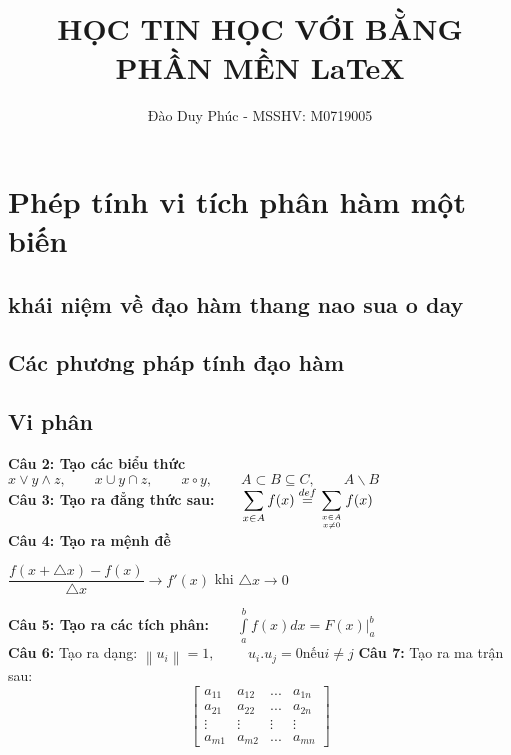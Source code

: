 \documentclass[12pt,a4paper]{book}
\author{Đào Duy Phúc - MSSHV: M0719005}
\title{HỌC TIN HỌC VỚI BẰNG PHẦN MỀN \LaTeX}
\theoremstyle{plain}%
\begin{document}
\maketitle %
\chapter[chương 1:] {Phép tính vi tích phân hàm một biến}
\section{khái niệm về đạo hàm thang nao sua o day}
\section{Các phương pháp tính đạo hàm}
\section{Vi phân}
\fontsize{17pt}{40pt}\selectfont
\textbf{Câu 2: Tạo các biểu thức}
\fontsize{17pt}{40pt}\selectfont\\
$ x\vee y\wedge z, \qquad x\cup y\cap z, \qquad x\circ y, \qquad A\subset B\subseteq C,\qquad A\backslash B $\\
\textbf{Câu 3: Tạo ra đẳng thức sau:}$\qquad\displaystyle \sum_{x\in A}f(x)\stackrel{de f}{=}\displaystyle
\sum _{x\in A\atop x\neq 0}f(x)$\\
\textbf{Câu 4: Tạo ra mệnh đề}\\
\begin{center}
$\dfrac{f(x+\bigtriangleup x)-f(x)}{\bigtriangleup x}\longrightarrow f'(x)$ \mbox{khi} $ \bigtriangleup x\rightarrow0$\\
\end{center}
\textbf{Câu 5: Tạo ra các tích phân:}$\qquad\int\limits_a^b {f(x)dx = \left. {F\left( x \right)} \right|_a^b} $\\
\textbf{Câu 6:} Tạo ra dạng: \qquad$\left\| {{u_i}} \right\| = 1,$ $\qquad{u_i}.{u_j} = 0$\qquad \mbox{nếu}\qquad $i \ne j$
\textbf{Câu 7:} Tạo ra ma trận sau:\\
\[\left[ {\begin{array}{*{20}{c}}
{{a_{11}}}&{{a_{12}}}&{...}&{{a_{1n}}}\\
{{a_{21}}}&{{a_{22}}}&{...}&{{a_{2n}}}\\
 \vdots & \vdots & \vdots & \vdots \\
{{a_{m1}}}&{{a_{m2}}}&{...}&{{a_{mn}}}
\end{array}} \right]\]
\end{document}

